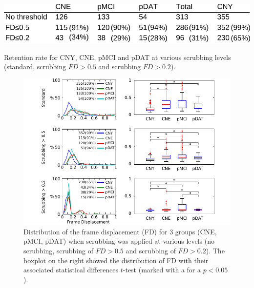 \begin{table}[H]
\begin{center}
\includegraphics[width=0.75\linewidth]{../figures/table_retention.pdf}
\end{center}
\caption[Retention table after scrubbing]{
Retention rate for CNY, CNE, pMCI and pDAT at various scrubbing levels (standard, scrubbing $FD>0.5$ and scrubbing $FD >0.2$).
}
\label{tab_retention}
\end{table}

\begin{figure}[H]
\begin{center}
\includegraphics[width=\linewidth]{../figures/figure_fd_distrib.pdf}
\end{center}
\caption[FD distribution among groups]{
Distribution of the frame displacement (FD) for 3 groups (CNE, pMCI, pDAT) when scrubbing was applied at various levels (no scrubbing, scrubbing of $FD>0.5$ and scrubbing of $FD>0.2$). The boxplot on the right showed the distribution of FD with their associated statistical differences $t$-test (marked with a {\bf *} for a $p<0.05$).
}
\label{fig_dist}
\end{figure}

